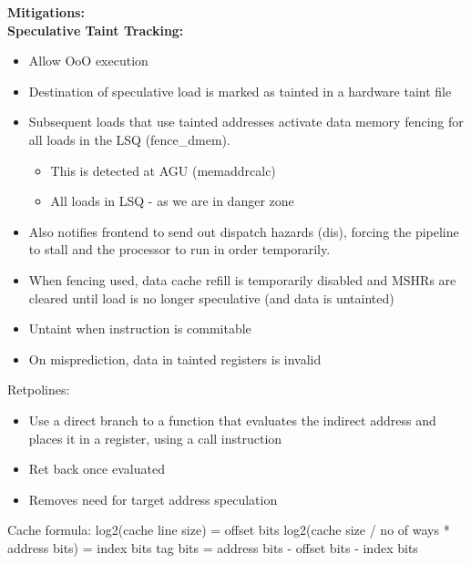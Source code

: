 \documentclass[a4paper, 5pt, twocolumn]{article}
\begin{document}
\bf Mitigations:\\
Speculative Taint Tracking:
\begin{itemize}[topsep=0pt,itemsep=-1ex,partopsep=1ex,parsep=1ex]
	\item Allow OoO execution
	\item Destination of speculative load is marked as tainted in a hardware taint file
	\item Subsequent loads that use tainted addresses activate data memory fencing for all loads in the LSQ (fence\_dmem).
	\begin{itemize}[topsep=0pt,itemsep=-1ex,partopsep=1ex,parsep=1ex]
		\item This is detected at AGU (memaddrcalc)
		\item All loads in LSQ - as we are in danger zone
	\end{itemize}
	\item Also notifies frontend to send out dispatch hazards (dis), forcing the pipeline to stall and the processor to run in order temporarily.
	\item When fencing used, data cache refill is temporarily disabled and MSHRs are cleared until load is no longer speculative (and data is untainted)
	\item Untaint when instruction is commitable
	\item On misprediction, data in tainted registers is invalid
\end{itemize}

Retpolines:

\begin{itemize}[topsep=0pt,itemsep=-1ex,partopsep=1ex,parsep=1ex]
	\item Use a direct branch to a function that evaluates the indirect address and places it in a register, using a call instruction
	\item Ret back once evaluated
	\item Removes need for target address speculation
\end{itemize}

Cache formula: log2(cache line size) = offset bits log2(cache size / no of ways * address bits) = index bits tag bits = address bits - offset bits - index bits
\end{document}
